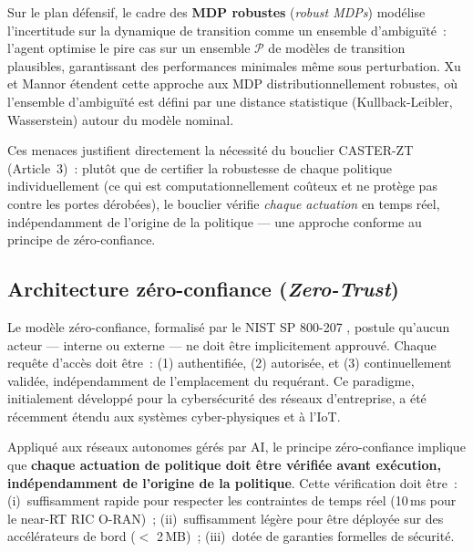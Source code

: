 Sur le plan défensif, le cadre des \textbf{MDP robustes} (\emph{robust MDPs}) \cite{Iyengar2005RobustMDP} modélise l'incertitude sur la dynamique de transition comme un ensemble d'ambiguïté~: l'agent optimise le pire cas sur un ensemble $\mathcal{P}$ de modèles de transition plausibles, garantissant des performances minimales même sous perturbation. Xu et Mannor \cite{Xu2010DistRobustMDP} étendent cette approche aux MDP distributionnellement robustes, où l'ensemble d'ambiguïté est défini par une distance statistique (Kullback-Leibler, Wasserstein) autour du modèle nominal.

Ces menaces justifient directement la nécessité du bouclier CASTER-ZT (Article~3)~: plutôt que de certifier la robustesse de chaque politique individuellement (ce qui est computationnellement coûteux et ne protège pas contre les portes dérobées), le bouclier vérifie \emph{chaque actuation} en temps réel, indépendamment de l'origine de la politique --- une approche conforme au principe de zéro-confiance.

\subsection{Architecture zéro-confiance (\emph{Zero-Trust})}

Le modèle zéro-confiance, formalisé par le NIST SP 800-207 \cite{rose2020nist}, postule qu'aucun acteur --- interne ou externe --- ne doit être implicitement approuvé. Chaque requête d'accès doit être~: (1) authentifiée, (2) autorisée, et (3) continuellement validée, indépendamment de l'emplacement du requérant. Ce paradigme, initialement développé pour la cybersécurité des réseaux d'entreprise, a été récemment étendu aux systèmes cyber-physiques et à l'IoT.

Appliqué aux réseaux autonomes gérés par AI, le principe zéro-confiance implique que \textbf{chaque actuation de politique doit être vérifiée avant exécution, indépendamment de l'origine de la politique}. Cette vérification doit être~: (i)~suffisamment rapide pour respecter les contraintes de temps réel (10\,ms pour le near-RT RIC O-RAN)~; (ii)~suffisamment légère pour être déployée sur des accélérateurs de bord ($<$ 2\,MB)~; (iii)~dotée de garanties formelles de sécurité.

